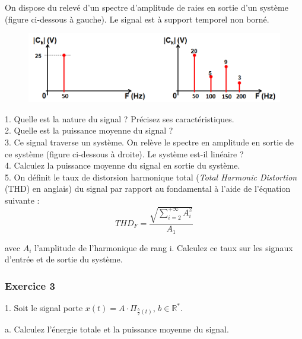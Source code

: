 	On dispose du relevé d'un spectre d'amplitude de raies en sortie d'un système (figure ci-dessous à gauche). Le signal est à support temporel non borné.
	
	\begin{figure}[h!]
		\centering
		\includegraphics[scale=0.5]{images/Exo_8_2.png} 
	\end{figure}
	
	1. Quelle est la nature du signal ? Précisez ses caractéristiques.\\
	
	2. Quelle est la puissance moyenne du signal ?\\
	
	3. Ce signal traverse un système. On relève le spectre en amplitude en sortie de ce système (figure ci-dessous à droite). Le système est-il linéaire ?\\
	
	4. Calculez la puissance moyenne du signal en sortie du système.\\
	
	5. On définit le taux de distorsion harmonique total (\textit{Total Harmonic Distortion} (THD) en anglais) du signal par rapport au fondamental à l'aide de l'équation suivante :
	\begin{equation*}
	THD_{F}=\frac{\sqrt{\sum_{i=2}^{+\infty}A_{i}^{2}}}{A_{1}}
	\end{equation*}
	
	avec  $A_{i}$ l'amplitude de l'harmonique de rang i. Calculez ce taux sur les signaux d'entrée et de sortie du système.
	
	\vspace{1\baselineskip}
	
	
	\subsubsection{Exercice 3}
	
	1. Soit le signal porte $x(t)=A\cdot \Pi_{\frac{b}{2}(t)}$, $b\in \mathbb{R^{*}}$.
	
	a. Calculez l'énergie totale et la puissance moyenne du signal.
	
